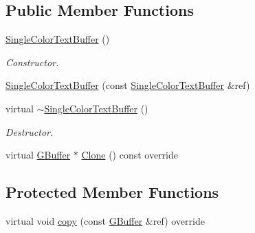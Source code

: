 \subsection*{Public Member Functions}
\begin{DoxyCompactItemize}
\item 
\mbox{\label{class_geometry_engine_1_1_geometry_buffer_1_1_single_color_text_buffer_a5c0841f56cbf2f652cfbf0d64c7abbce}} 
\mbox{\hyperlink{class_geometry_engine_1_1_geometry_buffer_1_1_single_color_text_buffer_a5c0841f56cbf2f652cfbf0d64c7abbce}{Single\+Color\+Text\+Buffer}} ()
\begin{DoxyCompactList}\small\item\em Constructor. \end{DoxyCompactList}\item 
\mbox{\hyperlink{class_geometry_engine_1_1_geometry_buffer_1_1_single_color_text_buffer_ad0e30e16f3630ecf9ca654688b964067}{Single\+Color\+Text\+Buffer}} (const \mbox{\hyperlink{class_geometry_engine_1_1_geometry_buffer_1_1_single_color_text_buffer}{Single\+Color\+Text\+Buffer}} \&ref)
\item 
\mbox{\label{class_geometry_engine_1_1_geometry_buffer_1_1_single_color_text_buffer_a1e75b34afff12fbfd4a4058580a1bcd7}} 
virtual \mbox{\hyperlink{class_geometry_engine_1_1_geometry_buffer_1_1_single_color_text_buffer_a1e75b34afff12fbfd4a4058580a1bcd7}{$\sim$\+Single\+Color\+Text\+Buffer}} ()
\begin{DoxyCompactList}\small\item\em Destructor. \end{DoxyCompactList}\item 
virtual \mbox{\hyperlink{class_geometry_engine_1_1_geometry_buffer_1_1_g_buffer}{G\+Buffer}} $\ast$ \mbox{\hyperlink{class_geometry_engine_1_1_geometry_buffer_1_1_single_color_text_buffer_add00c2857f9d425600ef83d50a9c8019}{Clone}} () const override
\end{DoxyCompactItemize}
\subsection*{Protected Member Functions}
\begin{DoxyCompactItemize}
\item 
virtual void \mbox{\hyperlink{class_geometry_engine_1_1_geometry_buffer_1_1_single_color_text_buffer_a6e266272638dd67cec7b6d57f172eae2}{copy}} (const \mbox{\hyperlink{class_geometry_engine_1_1_geometry_buffer_1_1_g_buffer}{G\+Buffer}} \&ref) override
\end{DoxyCompactItemize}
